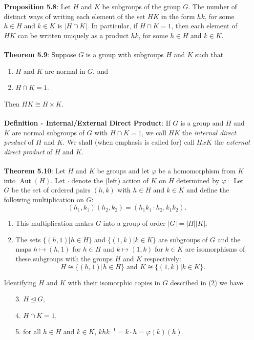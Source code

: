 \documentclass{article}
\DeclareMathOperator{\aut}{Aut}
\begin{document}
\textbf{Proposition 5.8}: Let $H$ and $K$ be subgroups of the group $G$. The number of distinct ways of writing each element of the set $HK$ in the form $hk$, for some $h \in H$ and $k \in K$ is $|H \cap K|$. In particular, if $H \cap K = 1$, then each element of $HK$ can be written uniquely as a product $hk$, for some $h \in H$ and $k \in K$. \\ \\
\textbf{Theorem 5.9}: Suppose $G$ is a group with subgroups $H$ and $K$ such that \begin{enumerate}
    \item $H$ and $K$ are normal in $G$, and
    \item $H \cap K = 1$.
\end{enumerate} Then $HK \cong H \times K.$ \\ \\
\textbf{Definition - Internal/External Direct Product}: If $G$ is a group and $H$ and $K$ are normal subgroups of $G$ with $H \cap K = 1$, we call $HK$ the \textit{internal direct product} of $H$ and $K$. We shall (when emphasis is called
for) call $H x K$ the \textit{external direct product} of $H$ and $K$. \\ \\
\textbf{Theorem 5.10}: Let $H$ and $K$ be groups and let $\varphi$ be a homomorphism from $K$ into $\aut(H)$. Let $\cdot$ denote the (left) action of $K$ on $H$ determined by $\varphi$· Let $G$ be the set of ordered pairs $(h, k)$ with $h \in H$ and $k \in K$ and define the following multiplication on $G$: $$(h_1, k_1)(h_2, k_2) = (h_1 k_1 \cdot h_2, k_1 k_2).$$ \begin{enumerate}
    \item This multiplication makes $G$ into a group of order $|G| = |H||K|$.
    \item The sets $\{(h, 1) | h \in H\}$ and $\{(1, k) | k \in K\}$ are subgroups of $G$ and the maps $h \mapsto (h, 1)$ for $h \in H$ and $k \mapsto (1 , k)$ for $k \in K$ are isomorphisms of these subgroups with the groups $H$ and $K$ respectively: $$H \cong \{(h, 1) | h \in H\} \text{ and } K \cong \{(1, k) | k \in K\}.$$
\end{enumerate} Identifying $H$ and $K$ with their isomorphic copies in $G$ described in (2) we have \begin{enumerate}
    \item[3.] $H \trianglelefteq G$,
    \item[4.] $H \cap K = 1$,
    \item[5.] for all $h \in H$ and $k \in K$, $khk^{-1} = k \cdot h = \varphi(k)(h).$
\end{enumerate} $ $ \\
\end{document}
